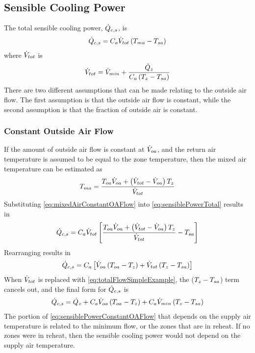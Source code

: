 \subsection{Sensible Cooling Power}

\newcommand{\totalFlow}{\flow{min} + \frac{\heatenergy{z}}{C_{a}\left(T_{z}-\sat{}\right)}}
The total sensible cooling power, \(\dot{Q}_{c,s}\), is
\begin{equation}\label{eq:sensiblePowerTotal}
    \dot{Q}_{c,s} =  C_{a} \dot{V}_{tot} \left(T_{ma}{}-T_{sa}{}\right)
\end{equation}
where \(\dot{V}_{tot}\) is 
\begin{equation}\label{eq:totalFlowSimpleExample}
    \flow{tot} = \totalFlow{}
\end{equation}
There are two different assumptions that can be made relating to the
outside air flow. The first assumption is that the outside air flow is
constant, while the second assumption is that the fraction of outside
air is constant. 

\subsubsection{Constant Outside Air Flow} 

If the amount of outside air flow is constant at \(\dot{V}_{oa}\), and the
return air temperature is assumed to be equal to the zone temperature,
then the mixed air temperature can be estimated as 
\begin{equation}\label{eq:mixedAirConstantOAFlow}
    T_{ma}{} = \frac{T_{oa}{} \dot{V}_{oa} + \left(\dot{V}_{tot}-\dot{V}_{oa}\right) T_{z}}{\dot{V}_{tot}} 
\end{equation}
Substituting  \ref{eq:mixedAirConstantOAFlow} into
\ref{eq:sensiblePowerTotal} results in
\begin{equation}
    \dot{Q}_{c,s} = C_{a} \dot{V}_{tot} \left[ \frac{T_{oa}{} \dot{V}_{oa} +
    \left(\dot{V}_{tot}-\dot{V}_{oa}\right) T_{z}}{\dot{V}_{tot}}  - T_{sa}{}  \right]
\end{equation}
Rearranging results in
\begin{equation}
    \dot{Q}_{c,s} = C_{a} \left[ \dot{V}_{oa} \left(T_{oa}{} - T_{z}\right) + \dot{V}_{tot}
    \left(T_{z} - T_{sa}{}\right)  \right]
\end{equation}
When \(\dot{V}_{tot}\) is replaced with 
\ref{eq:totalFlowSimpleExample}, the (\(T_{z}-T_{sa}{}\)) term cancels
out, and the final form for \(\dot{Q}_{c,s}\) is 
\begin{equation}\label{eq:sensiblePowerConstantOAFlow}
    \dot{Q}_{c,s} = \dot{Q}_{z} + C_{a} \dot{V}_{oa}
    \left(T_{oa}{}-T_{z}\right)  + C_{a} \dot{V}_{min} \left(T_{z} - T_{sa}{} \right)
\end{equation}
The portion of  \ref{eq:sensiblePowerConstantOAFlow} that
depends on the supply air temperature is related to the minimum flow, or
the zones that are in reheat. If no zones were in reheat, then the
sensible cooling power would not depend on the supply air temperature. 

